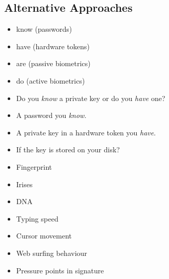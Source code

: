 \subsection{Alternative Approaches}

\begin{frame}
  \begin{example}
    \begin{itemize}
      \item know (passwords)
      \item have (hardware tokens)
      \item are (passive biometrics)
      \item do (active biometrics)
    \end{itemize}
  \end{example}

  \pause{}

  \begin{remark}
    \begin{itemize}
      \item Do you \emph{know} a private key or do you \emph{have} one?
      \item A password you \emph{know}.
      \item A private key in a hardware token you \emph{have}.
      \item If the key is stored on your disk?
    \end{itemize}
  \end{remark}
\end{frame}

\begin{frame}
  \begin{example}
    \begin{itemize}
      \item Fingerprint
      \item Irises
      \item DNA
    \end{itemize}
  \end{example}

  \pause{}

  \begin{example}
    \begin{itemize}
      \item Typing speed
      \item Cursor movement
      \item Web surfing behaviour
      \item Pressure points in signature
    \end{itemize}
  \end{example}
\end{frame}

